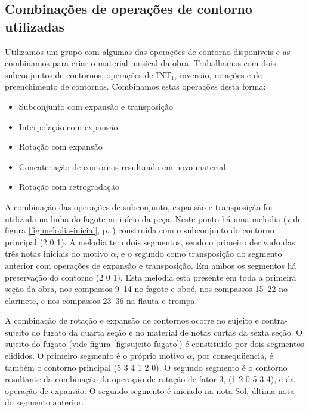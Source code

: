 \subsection{Combinações de operações de contorno utilizadas}
\label{sec:comb-de-oper}

Utilizamos um grupo com algumas das operações de contorno disponíveis
e as combinamos para criar o material musical da obra. Trabalhamos com
dois subconjuntos de contornos, operações de INT$_1$, inversão,
rotações e de preenchimento de contornos. Combinamos estas operações
desta forma:

\begin{itemize}
\item Subconjunto com expansão e transposição
\item Interpolação com expansão
\item Rotação com expansão
\item Concatenação de contornos resultando em novo material
\item Rotação com retrogradação
\end{itemize}

A combinação das operações de subconjunto, expansão e transposição foi
utilizada na linha do fagote no início da peça. Neste ponto há uma
melodia (vide figura \ref{fig:melodia-inicial},
p. \pageref{fig:melodia-inicial}) construída com o subconjunto do
contorno principal (2 0 1). A melodia tem dois segmentos, sendo o
primeiro derivado das três notas iniciais do motivo $\alpha$, e o
segundo como transposição do segmento anterior com operações de
expansão e transposição. Em ambos os segmentos há preservação do
contorno (2 0 1). Esta melodia está presente em toda a primeira seção
da obra, nos compassos 9--14 no fagote e oboé, nos compassos 15--22 no
clarinete, e nos compassos 23--36 na flauta e trompa.

A combinação de rotação e expansão de contornos ocorre no sujeito e
contra-sujeito do fugato da quarta seção e no material de notas curtas
da sexta seção. O sujeito do fugato (vide figura
\ref{fig:sujeito-fugato}) é constituído por dois segmentos elididos. O
primeiro segmento é o próprio motivo $\alpha$, por consequüencia, é
também o contorno principal (5 3 4 1 2 0). O segundo segmento é o
contorno resultante da combinação da operação de rotação de fator 3,
(1 2 0 5 3 4), e da operação de expansão. O segundo segmento é
iniciado na nota Sol, última nota do segmento anterior.

